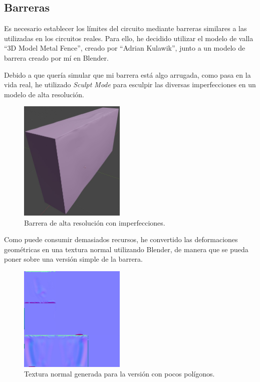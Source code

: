 \newpage

\subsection{Barreras}

Es necesario establecer los límites del circuito mediante barreras similares a las utilizadas en los circuitos reales. Para ello, he decidido utilizar el modelo de valla ``3D Model Metal Fence''\cite{fence}, creado por ``Adrian Kulawik'', junto a un modelo de barrera creado por mí en Blender.

\bigskip

Debido a que quería simular que mi barrera está algo arrugada, como pasa en la vida real, he utilizado \textit{Sculpt Mode} para esculpir las diversas imperfecciones en un modelo de alta resolución. 

\begin{figure}[H]
    \centering
    \includegraphics[width=0.45\textwidth]{imagenes/converted/barrier/barrierHP.jpg}
    \caption{Barrera de alta resolución con imperfecciones.}
    \label{fig:barreraHP}
\end{figure}

Como puede consumir demasiados recursos, he convertido las deformaciones geométricas en una textura normal utilizando Blender, de manera que se pueda poner sobre una versión simple de la barrera.

\begin{figure}[H]
    \centering
    \includegraphics[width=0.45\textwidth]{imagenes/converted/barrier/barrierNormal.jpg}
    \caption{Textura normal generada para la versión con pocos polígonos.}
    \label{fig:barreraLP}
\end{figure}


